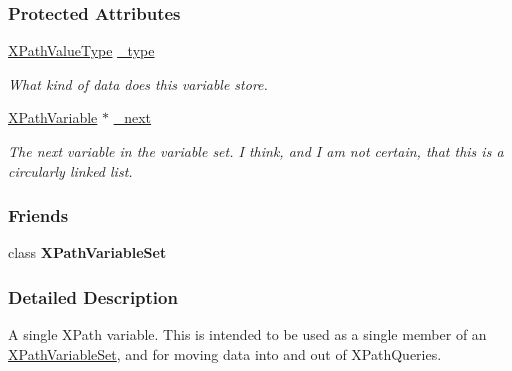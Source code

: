 \subsubsection*{Protected Attributes}
\begin{DoxyCompactItemize}
\item 
\hypertarget{classphys_1_1xml_1_1XPathVariable_a8841d47677912f4b88743928cf931eac}{
\hyperlink{namespacephys_1_1xml_a339b9eef674ba44100110e5524bc575d}{XPathValueType} \hyperlink{classphys_1_1xml_1_1XPathVariable_a8841d47677912f4b88743928cf931eac}{\_\-type}}
\label{classphys_1_1xml_1_1XPathVariable_a8841d47677912f4b88743928cf931eac}

\begin{DoxyCompactList}\small\item\em What kind of data does this variable store. \item\end{DoxyCompactList}\item 
\hypertarget{classphys_1_1xml_1_1XPathVariable_abe57b58f8b6d2622d5e1ae93bc5361a3}{
\hyperlink{classphys_1_1xml_1_1XPathVariable}{XPathVariable} $\ast$ \hyperlink{classphys_1_1xml_1_1XPathVariable_abe57b58f8b6d2622d5e1ae93bc5361a3}{\_\-next}}
\label{classphys_1_1xml_1_1XPathVariable_abe57b58f8b6d2622d5e1ae93bc5361a3}

\begin{DoxyCompactList}\small\item\em The next variable in the variable set. I think, and I am not certain, that this is a circularly linked list. \item\end{DoxyCompactList}\end{DoxyCompactItemize}
\subsubsection*{Friends}
\begin{DoxyCompactItemize}
\item 
\hypertarget{classphys_1_1xml_1_1XPathVariable_a6d8e28205e67fa0164160dd3cb547fe6}{
class {\bfseries XPathVariableSet}}
\label{classphys_1_1xml_1_1XPathVariable_a6d8e28205e67fa0164160dd3cb547fe6}

\end{DoxyCompactItemize}


\subsubsection{Detailed Description}
A single XPath variable. This is intended to be used as a single member of an \hyperlink{classphys_1_1xml_1_1XPathVariableSet}{XPathVariableSet}, and for moving data into and out of XPathQueries. 

